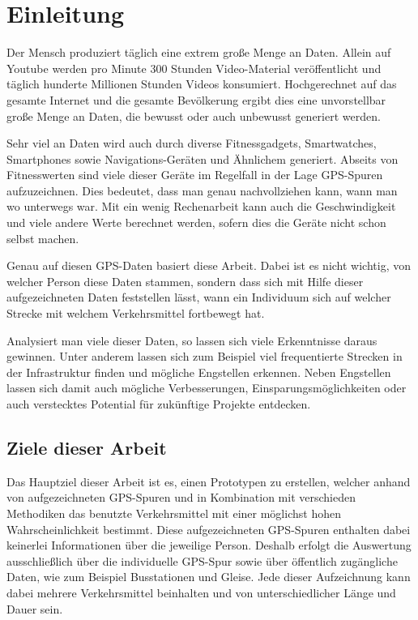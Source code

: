 \chapter{Einleitung}
Der Mensch produziert täglich eine extrem große Menge an Daten. Allein auf Youtube werden pro Minute 300 Stunden Video-Material veröffentlicht und täglich hunderte Millionen Stunden Videos konsumiert.  \cite{youtube_statistics_2015} Hochgerechnet auf das gesamte Internet und die gesamte Bevölkerung ergibt dies eine unvorstellbar große Menge an Daten, die bewusst oder auch unbewusst generiert werden. 

Sehr viel an Daten wird auch durch diverse Fitnessgadgets, Smartwatches, Smartphones sowie Navigations-Geräten und Ähnlichem generiert. Abseits von Fitnesswerten sind viele dieser Geräte im Regelfall in der Lage GPS-Spuren aufzuzeichnen. Dies bedeutet, dass man genau nachvollziehen kann, wann man wo unterwegs war. Mit ein wenig Rechenarbeit kann auch die Geschwindigkeit und viele andere Werte berechnet werden, sofern dies die Geräte nicht schon selbst machen. 

Genau auf diesen GPS-Daten basiert diese Arbeit. Dabei ist es nicht wichtig, von welcher Person diese Daten stammen, sondern dass sich mit Hilfe dieser aufgezeichneten Daten feststellen lässt, wann ein Individuum sich auf welcher Strecke mit welchem Verkehrsmittel fortbewegt hat.

Analysiert man viele dieser Daten, so lassen sich viele Erkenntnisse daraus gewinnen. Unter anderem lassen sich zum Beispiel viel frequentierte Strecken in der Infrastruktur finden und mögliche Engstellen erkennen. Neben Engstellen lassen sich damit auch mögliche Verbesserungen, Einsparungsmöglichkeiten oder auch verstecktes Potential für zukünftige Projekte entdecken.

\section{Ziele dieser Arbeit}
Das Hauptziel dieser Arbeit ist es, einen Prototypen zu erstellen, welcher anhand von aufgezeichneten GPS-Spuren und in Kombination mit verschieden Methodiken das benutzte Verkehrsmittel mit einer möglichst hohen Wahrscheinlichkeit bestimmt. Diese aufgezeichneten GPS-Spuren enthalten dabei keinerlei Informationen über die jeweilige Person. Deshalb erfolgt die Auswertung ausschließlich über die individuelle GPS-Spur sowie über öffentlich zugängliche Daten, wie zum Beispiel Busstationen und Gleise. Jede dieser Aufzeichnung kann dabei mehrere Verkehrsmittel beinhalten und von unterschiedlicher Länge und Dauer sein.

